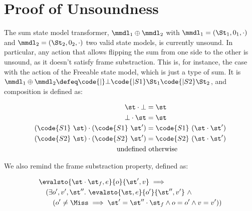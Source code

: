 \section{Proof of Unsoundness}

\newcommand{\sone}[0]{\code{S1}~}
\newcommand{\stwo}[0]{\code{S2}~}

The sum state model transformer, $\mmdl_1 \oplus \mmdl_2$ with $\mmdl_1 = (\St_1, 0_1, \cdot)$ and $\mmdl_2 = (\St_2, 0_2, \cdot)$ two valid state models, is currently unsound. In particular, any action that allows flipping the sum from one side to the other is unsound, as it doesn't satisfy frame substraction. This is, for instance, the case with the  action of the Freeable state model, which is just a type of sum. It is $\mmdl_1 \oplus \mmdl_2 \defeq \code{| }\bot \code{ | S1 } \St_1 \code{ | S2 } \St_2$, and composition is defined as:

\begin{align*}
	\st \cdot \bot &= \st\\
	\bot \cdot \st &= \st\\
	(\sone\st) \cdot (\sone\st') &= \sone(\st\cdot\st')\\
	(\stwo\st) \cdot (\stwo\st') &= \stwo(\st\cdot\st')\\
	\text{undefined}&\text{ otherwise}
\end{align*}

We also remind the frame substraction property, defined as:

\begin{align*}
	&\evalsto{\st\cdot\st_f,e}{o}{\st',v}\implies\\
	&\quad(\exists o',v',\st''.~\evalsto{\st,e}{o'}{\st'',v'}~\land\\
	&\qquad(o'\neq \Miss \implies \st'=\st''\cdot\st_f\land o=o'\land v=v'))
\end{align*}

\newcommand{\swap}[0]{\code{swap}}
\newcommand{\execswap}[3]{\exec{#1}{\swap}{}{#2}{#3}}

